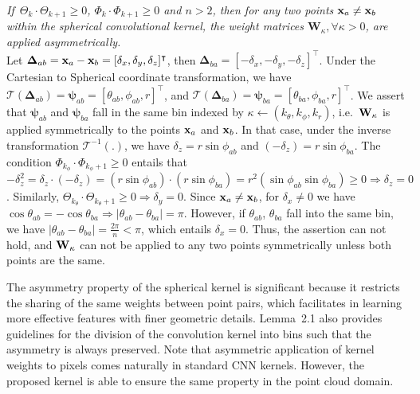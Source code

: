 \documentclass[10pt,twocolumn,letterpaper]{article}
\begin{document}
 \emph{If~$\Theta_k\cdot\Theta_{k+1}\geq 0$,  $\Phi_k\cdot\Phi_{k+1}\geq 0$ and $n>2$, then for any two points $\bold{x}_a\neq\bold{x}_b$ within the spherical convolutional kernel, the weight matrices $\mathbf W_{\kappa}, \forall \kappa>0$, are applied asymmetrically.}\\
Let $\boldsymbol{\Delta}_{ab}= {\bf x}_a - {\bf x}_b =[\delta_x,\delta_y,\delta_z]^{\intercal}$, then $\boldsymbol{\Delta}_{ba}=[-\delta_x,-\delta_y,-\delta_z]^{\intercal}$.  Under the Cartesian to Spherical coordinate transformation,  we have $\mathcal T(\boldsymbol{\Delta}_{ab}) =\boldsymbol{\psi}_{ab}=[\theta_{ab},\phi_{ab},r]^{\intercal}$,  and $\mathcal T(\boldsymbol{\Delta}_{ba}) = \boldsymbol{\psi}_{ba}=[\theta_{ba},\phi_{ba},r]^{\intercal}$. We assert that $\boldsymbol{\psi}_{ab}$ and $\boldsymbol{\psi}_{ba}$ fall in the same bin indexed by $\kappa \leftarrow (k_\theta,k_\phi,k_r)$, i.e.~${\bf W}_{\kappa}$ is applied symmetrically to the points ${\bf x}_a$ and ${\bf x}_b$.
In that case, under the inverse transformation $\mathcal T^{-1} (.)$, we have $\delta_z=r\sin\phi_{ab}$ and $(-\delta_z)=r\sin\phi_{ba}$.
The condition $\Phi_{k_\phi}\cdot\Phi_{k_\phi+1}\geq 0$ entails that $-\delta_z^2 = \delta_z\cdot(-\delta_z)=(r\sin\phi_{ab})\cdot(r\sin\phi_{ba})=r^2(\sin\phi_{ab}\sin\phi_{ba})\geq 0\Longrightarrow\delta_z=0$. Similarly,
$\Theta_{k_\theta}\cdot\Theta_{k_\theta+1}\geq 0 \Longrightarrow \delta_y=0$.
Since $\bold{x}_a\neq\bold{x}_b$, for  $\delta_x\neq0$ we have $ \cos\theta_{ab} = -\cos\theta_{ba} \Longrightarrow |\theta_{ab}-\theta_{ba}|=\pi$.
However, if  $\theta_{ab}$, $\theta_{ba}$ fall into the same bin, we have $|\theta_{ab}-\theta_{ba}|=\frac{2\pi}{n}<\pi$, which entails $\delta_x = 0$.  Thus, the assertion can not hold, and ${\bf W}_{\kappa}$ can not be applied to any two points symmetrically  unless both points are the same.

The asymmetry property of the spherical  kernel is significant because it restricts the sharing of the same weights between point pairs, which facilitates in learning more effective features with finer geometric details.
Lemma~2.1 also provides guidelines for the division of the convolution kernel into bins such that the asymmetry is always preserved.
Note that asymmetric application of kernel weights to pixels comes naturally in standard CNN kernels. However, the proposed kernel is able to ensure the same property in the point cloud domain.
\vspace{1mm}
\end{document}

